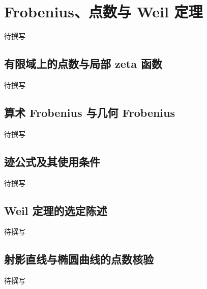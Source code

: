 \section{Frobenius、点数与 Weil 定理}
\label{g5:sec:A04}
待撰写

\subsection{有限域上的点数与局部 zeta 函数}
\label{g5:subsec:A04:01}
待撰写

\subsection{算术 Frobenius 与几何 Frobenius}
\label{g5:subsec:A04:02}
待撰写

\subsection{迹公式及其使用条件}
\label{g5:subsec:A04:03}
待撰写

\subsection{Weil 定理的选定陈述}
\label{g5:subsec:A04:04}
待撰写

\subsection{射影直线与椭圆曲线的点数核验}
\label{g5:subsec:A04:05}
待撰写
